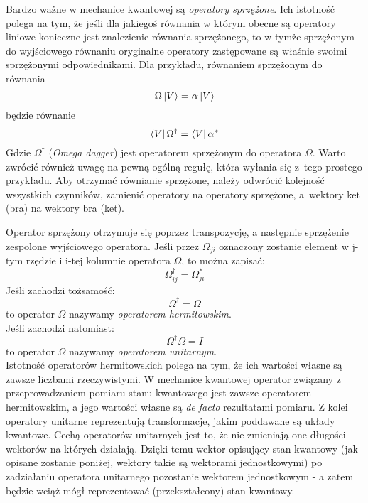 \documentclass[12pt,a4paper,twoside,openany]{book}
\begin{document}
Bardzo ważne w mechanice kwantowej są \textit{operatory sprzężone}. Ich istotność polega na tym, że jeśli dla jakiegoś równania w którym obecne są operatory liniowe konieczne jest znalezienie równania sprzężonego, to w tymże sprzężonym do wyjściowego równaniu oryginalne operatory zastępowane są właśnie swoimi sprzężonymi odpowiednikami. Dla przykładu, równaniem sprzężonym do równania
\begin{equation}
    \Omega\ket{V} = \alpha\ket{V}
\end{equation}
będzie równanie
\begin{equation}
    \bra{V}\Omega^\dagger = \bra{V}\alpha^*
\end{equation}
Gdzie  $\Omega^\dagger$ (\textit{Omega dagger}) jest operatorem sprzężonym do operatora $\Omega$.
Warto zwrócić również uwagę na pewną ogólną regułę, która wyłania się z~tego prostego przykładu. 
Aby otrzymać równianie sprzężone, należy odwrócić kolejność wszystkich czynników, zamienić operatory na operatory sprzężone, a~wektory ket (bra) na wektory bra (ket).

Operator sprzężony otrzymuje się poprzez transpozycję, a następnie sprzężenie zespolone wyjściowego operatora. Jeśli przez $\Omega_{ji}$ oznaczony zostanie element w j-tym rzędzie i i-tej kolumnie operatora $\Omega$, to można zapisać: 
\begin{equation}
    \Omega^\dagger_{ij} = \Omega^*_{ji}
\end{equation}
Jeśli zachodzi tożsamość:
\begin{equation}
    \Omega^\dagger = \Omega
\end{equation}
to operator $\Omega$ nazywamy \textit{operatorem hermitowskim}.
~\\
Jeśli zachodzi natomiast:
\begin{equation}
    \Omega^\dagger\Omega = \textit{I}
\end{equation}
to operator $\Omega$ nazywamy \textit{operatorem unitarnym}.
~\\

Istotność operatorów hermitowskich polega na tym, że ich wartości własne są zawsze liczbami rzeczywistymi. W mechanice kwantowej operator związany z przeprowadzaniem pomiaru stanu kwantowego jest zawsze operatorem hermitowskim, a jego wartości własne są \textit{de facto} rezultatami pomiaru.
Z kolei operatory unitarne reprezentują transformacje, jakim poddawane są układy kwantowe. Cechą operatorów unitarnych jest to, że nie zmieniają one długości wektorów na których działają. Dzięki temu wektor opisujący stan kwantowy (jak opisane zostanie poniżej, wektory takie są wektorami jednostkowymi) po zadziałaniu operatora unitarnego pozostanie wektorem jednostkowym - a zatem będzie wciąż mógł reprezentować (przekształcony) stan kwantowy.
\end{document}
